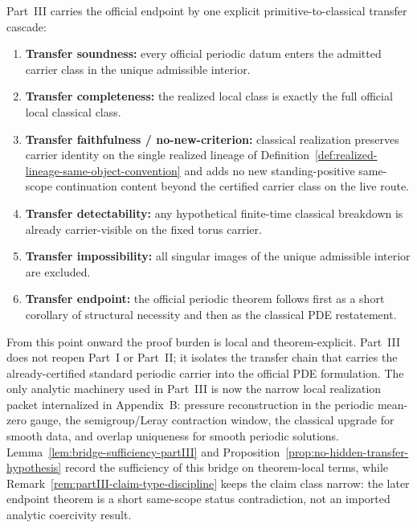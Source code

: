\begin{tcolorbox}[title={Part~III transfer cascade and claim types}, colback=blue!2!white, colframe=blue!55!black]
Part~III carries the official endpoint by one explicit primitive-to-classical transfer cascade:
\begin{enumerate}[label=(\roman*), leftmargin=2.2em, itemsep=0.2em, topsep=0.2em]
\item \textbf{Transfer soundness:} every official periodic datum enters the admitted carrier class in the unique admissible interior.
\item \textbf{Transfer completeness:} the realized local class is exactly the full official local classical class.
\item \textbf{Transfer faithfulness / no-new-criterion:} classical realization preserves carrier identity on the single realized lineage of Definition~\ref{def:realized-lineage-same-object-convention} and adds no new standing-positive same-scope continuation content beyond the certified carrier class on the live route.
\item \textbf{Transfer detectability:} any hypothetical finite-time classical breakdown is already carrier-visible on the fixed torus carrier.
\item \textbf{Transfer impossibility:} all singular images of the unique admissible interior are excluded.
\item \textbf{Transfer endpoint:} the official periodic theorem follows first as a short corollary of structural necessity and then as the classical PDE restatement.
\end{enumerate}
\end{tcolorbox}

From this point onward the proof burden is local and theorem-explicit. Part~III does not reopen Part~I or Part~II; it isolates the transfer chain that carries the already-certified standard periodic carrier into the official PDE formulation. The only analytic machinery used in Part~III is now the narrow local realization packet internalized in Appendix~B: pressure reconstruction in the periodic mean-zero gauge, the semigroup/Leray contraction window, the classical upgrade for smooth data, and overlap uniqueness for smooth periodic solutions. Lemma~\ref{lem:bridge-sufficiency-partIII} and Proposition~\ref{prop:no-hidden-transfer-hypothesis} record the sufficiency of this bridge on theorem-local terms, while Remark~\ref{rem:partIII-claim-type-discipline} keeps the claim class narrow: the later endpoint theorem is a short same-scope status contradiction, not an imported analytic coercivity result.


